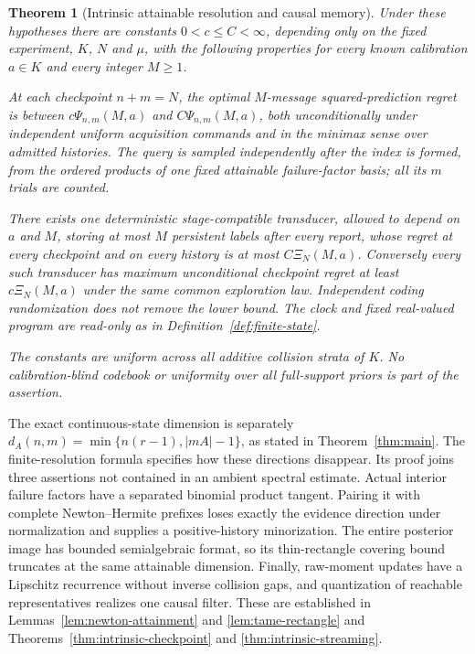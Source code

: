 \documentclass[11pt]{amsart}
\newtheorem{theorem}{Theorem}[section]
\theoremstyle{definition}\newtheorem{definition}[theorem]{Definition}
\theoremstyle{remark}\newtheorem{remark}[theorem]{Remark}
\begin{document}
\begin{theorem}[Intrinsic attainable resolution and causal memory]\label{thm:resolution-main}
Under these hypotheses there are constants $0<c\le C<\infty$,
depending only on the fixed experiment, $K$, $N$ and $\mu$, with the
following properties for every known calibration $a\in K$ and every
integer $M\ge1$.

At each checkpoint $n+m=N$, the optimal $M$-message squared-prediction
regret is between $c\Psi_{n,m}(M,a)$ and $C\Psi_{n,m}(M,a)$,
both unconditionally under independent uniform acquisition commands and
in the minimax sense over admitted histories. The query is sampled
independently after the index is formed, from the ordered products of
one fixed attainable failure-factor basis; all its $m$ trials are counted.

There exists one deterministic stage-compatible transducer, allowed to
depend on $a$ and $M$, storing at most $M$ persistent labels after
every report, whose regret at every checkpoint and on every history is
at most $C\Xi_N(M,a)$. Conversely every such transducer has maximum
unconditional checkpoint regret at least $c\Xi_N(M,a)$ under the
same common exploration law. Independent coding randomization does not
remove the lower bound. The clock and fixed real-valued program are
read-only as in Definition~\ref{def:finite-state}.

The constants are uniform across all additive collision strata of $K$.
No calibration-blind codebook or uniformity over all full-support priors
is part of the assertion.
\end{theorem}


The exact continuous-state dimension is separately
$d_A(n,m)=\min\{n(r-1),|mA|-1\}$, as stated in
Theorem~\ref{thm:main}. The finite-resolution formula specifies how
these directions disappear. Its proof joins three assertions not
contained in an ambient spectral estimate. Actual interior failure
factors have a separated binomial product tangent. Pairing it with
complete Newton--Hermite prefixes loses exactly the evidence direction
under normalization and supplies a positive-history minorization.
The entire posterior image has bounded semialgebraic format, so its
thin-rectangle covering bound truncates at the same attainable
dimension. Finally, raw-moment updates have a Lipschitz recurrence
without inverse collision gaps, and quantization of reachable
representatives realizes one causal filter. These are established in
Lemmas~\ref{lem:newton-attainment} and \ref{lem:tame-rectangle} and
Theorems~\ref{thm:intrinsic-checkpoint} and
\ref{thm:intrinsic-streaming}.
\end{document}
